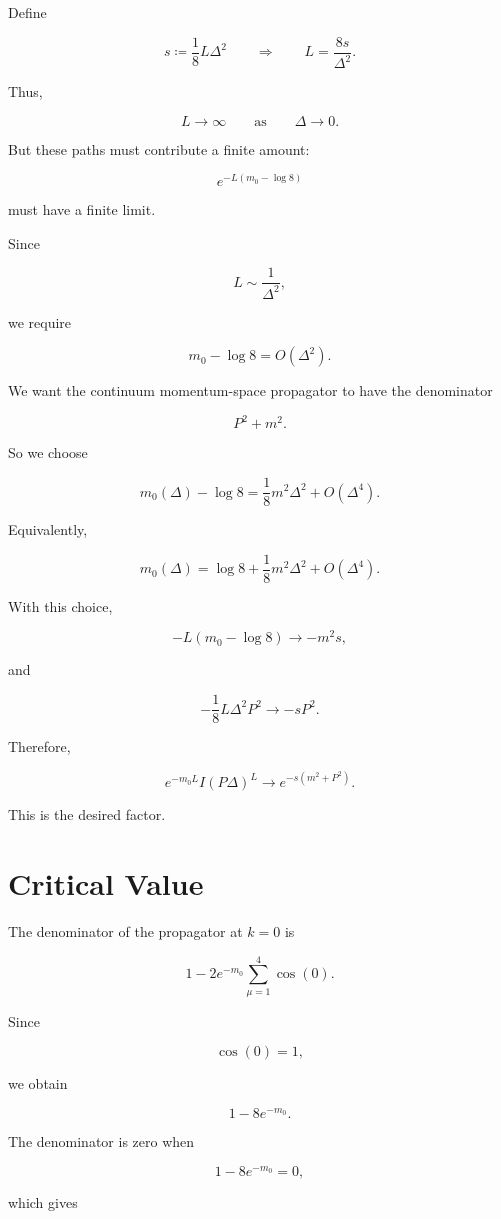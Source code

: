 \documentclass[12pt]{article}
\begin{document}
Define

\[
s
\coloneqq
\frac18L\Delta^2
\qquad\Longrightarrow\qquad
L
=
\frac{8s}{\Delta^2}.
\]

Thus,

\[
L\rightarrow\infty
\qquad
\text{as}
\qquad
\Delta\rightarrow0.
\]

But these paths must contribute a finite amount:

\[
e^{-L(m_0-\log8)}
\]

must have a finite limit.

Since

\[
L\sim\frac{1}{\Delta^2},
\]

we require

\[
m_0-\log8
=
O(\Delta^2).
\]

We want the continuum momentum-space propagator to have the denominator

\[
P^2+m^2.
\]

So we choose

\[
m_0(\Delta)-\log8
=
\frac18m^2\Delta^2
+
O(\Delta^4).
\]

Equivalently,

\[
\boxed{
m_0(\Delta)
=
\log8
+
\frac18m^2\Delta^2
+
O(\Delta^4).
}
\]

With this choice,

\[
-L(m_0-\log8)
\longrightarrow
-m^2s,
\]

and

\[
-\frac18L\Delta^2P^2
\longrightarrow
-sP^2.
\]

Therefore,

\[
\boxed{
e^{-m_0L}I(P\Delta)^L
\longrightarrow
e^{-s(m^2+P^2)}.
}
\]

This is the desired factor.

\section*{Critical Value}

The denominator of the propagator at $k=0$ is

\[
1-
2e^{-m_0}
\sum_{\mu=1}^{4}\cos(0).
\]

Since

\[
\cos(0)=1,
\]

we obtain

\[
1-8e^{-m_0}.
\]

The denominator is zero when

\[
1-8e^{-m_0}=0,
\]

which gives
\end{document}
